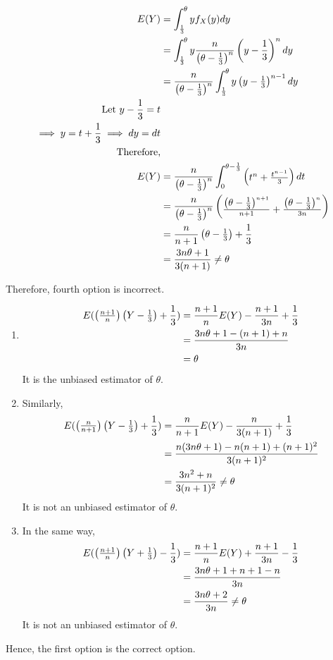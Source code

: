 \documentclass{article}[]
\begin{document}
\begin{align}
E(Y)&=\int_{\frac{1}{3}}^{\theta} yf_X(y) dy \\ 
&=\int_{\frac{1}{3}}^{\theta} y\frac{n}{\left(\theta-\frac{1}{3}\right)^n} \left(y-\frac{1}{3}\right)^n dy \\ 
&=\frac{n}{\begin{pmatrix}\theta-\frac{1}{3}\end{pmatrix}^n}\int_{\frac{1}{3}}^{\theta} y\begin{pmatrix}y-\frac{1}{3}\end{pmatrix}^{n-1} dy \\ 
\text{Let } y-\frac{1}{3}=t\\
\implies y=t+\frac{1}{3} \implies dy=dt \\
\text{Therefore,}\\
E(Y)&=\frac{n}{\begin{pmatrix}\theta-\frac{1}{3}\end{pmatrix}^n}\int_{0}^{\theta-\frac{1}{3}} \begin{pmatrix}t^n+\frac{t^{n-1}}{3}\end{pmatrix} dt \\
&=\frac{n}{\begin{pmatrix}\theta-\frac{1}{3}\end{pmatrix}^n} \begin{pmatrix}\frac{\begin{pmatrix}\theta-\frac{1}{3}\end{pmatrix}^{n+1}}{n+1} + \frac{\begin{pmatrix}\theta-\frac{1}{3}\end{pmatrix}^n}{3n}\end{pmatrix}\\
&=\frac{n}{n+1}\begin{pmatrix}\theta-\frac{1}{3}\end{pmatrix} + \frac{1}{3}\\
&=\frac{3n\theta + 1}{3(n+1)} \neq \theta
\end{align}

Therefore, fourth option is incorrect.

\begin{enumerate}
\item
{
\begin{align}
E(\begin{pmatrix}\frac{n+1}{n}\end{pmatrix}\begin{pmatrix}Y-\frac{1}{3}\end{pmatrix} + \frac{1}{3}) &= \frac{n+1}{n}E(Y)-\frac{n+1}{3n} + \frac{1}{3}\\
&=\frac{3n\theta+1-(n+1)+n}{3n}\\
&=\theta
\end{align}
It is the unbiased estimator of $\theta$.
}
\item
{
Similarly,
\begin{align}
E(\begin{pmatrix}\frac{n}{n+1}\end{pmatrix}\begin{pmatrix}Y-\frac{1}{3}\end{pmatrix} + \frac{1}{3})&=\frac{n}{n+1}E(Y) - \frac{n}{3(n+1)} + \frac{1}{3}\\
&=\frac{n(3n\theta+1) - n(n+1) + (n+1)^2}{3(n+1)^2}\\
&=\frac{3n^2+n}{3(n+1)^2} \neq \theta
\end{align}
It is not an unbiased estimator of $\theta$.
}
\item
{
In the same way,
\begin{align}
E(\begin{pmatrix}\frac{n+1}{n}\end{pmatrix}\begin{pmatrix}Y+\frac{1}{3}\end{pmatrix} - \frac{1}{3})&=\frac{n+1}{n}E(Y) + \frac{n+1}{3n} - \frac{1}{3}\\
&=\frac{3n\theta+1+n+1-n}{3n}\\
&=\frac{3n\theta+2}{3n} \neq \theta
\end{align}
It is not an unbiased estimator of $\theta$.
}
\end{enumerate}
Hence, the first option is the correct option.
\end{document}
